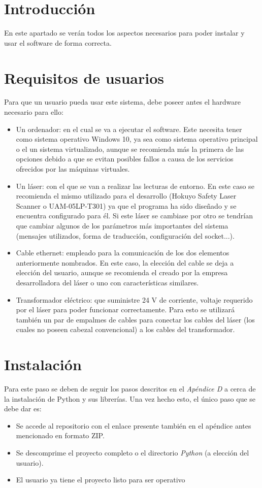 
\section{Introducción}
En este apartado se verán todos los aspectos necesarios para poder instalar y usar el software de forma correcta.

\section{Requisitos de usuarios}
Para que un usuario pueda usar este sistema, debe poseer antes el hardware necesario para ello:
\begin{itemize}
	\item Un ordenador: en el cual se va a ejecutar el software. Este necesita tener como sistema operativo Windows 10, ya sea como sistema operativo principal o el un sistema virtualizado, aunque se recomienda más la primera de las opciones debido a que se evitan posibles fallos a causa de los servicios ofrecidos por las máquinas virtuales.
	\item Un láser: con el que se van a realizar las lecturas de entorno. En este caso se recomienda el mismo utilizado para el desarrollo (Hokuyo Safety Laser Scanner  o UAM-05LP-T301) ya que el programa ha sido diseñado y se encuentra configurado para él. Si este láser se cambiase por otro se tendrían que cambiar algunos de los parámetros más importantes del sistema (mensajes utilizados, forma de traducción, configuración del socket...).
	\item Cable ethernet: empleado para la comunicación de los dos elementos anteriormente nombrados. En este caso, la elección del cable se deja a elección del usuario, aunque se recomienda el creado por la empresa desarrolladora del láser o uno con características similares.
	\item Transformador eléctrico: que suministre 24 V de corriente, voltaje requerido por el láser para poder funcionar correctamente. Para esto se utilizará también un par de empalmes de cables para conectar los cables del láser (los cuales no poseen cabezal convencional) a los cables del transformador.
\end{itemize}
\section{Instalación}
Para este paso se deben de seguir los pasos descritos en el \textit{Apéndice D} a cerca de la instalación de Python y sus librerías. Una vez hecho esto, el único paso que se debe dar es:
\begin{itemize}
	\item Se accede al repositorio con el enlace presente también en el apéndice antes mencionado en formato ZIP.
	\item Se descomprime el proyecto completo o el directorio \textit{Python} (a elección del usuario).
	\item El usuario ya tiene el proyecto listo para ser operativo
\end{itemize}

